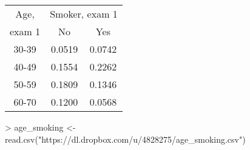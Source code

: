 \documentclass{article}
\begin{document}
\begin{table}[ht]
\begin{center}
\begin{tabular}{ccc}
 \hline
Age,&\multicolumn{2}{c}{Smoker, exam 1}\\
exam 1  & No& Yes   \\
\hline
30-39 &  0.0519   & 0.0742 \\
40-49 &  0.1554   & 0.2262 \\
50-59 &  0.1809   & 0.1346 \\
60-70 &  0.1200   & 0.0568 \\
\hline
\end{tabular}
\end{center}
\end{table}

\begin{Schunk}
\begin{Sinput}
> age_smoking <- read.csv("https://dl.dropbox.com/u/4828275/age_smoking.csv")
\end{Sinput}
\end{Schunk}
\end{document}
